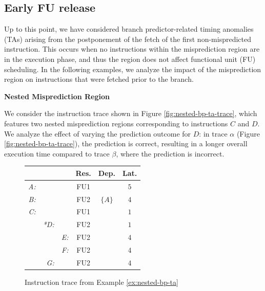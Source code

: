 \subsection{Early FU release}

Up to this point, we have considered branch predictor-related timing anomalies (TAs) arising from the postponement of the fetch of the first non-mispredicted instruction. This occurs when no instructions within the misprediction region are in the execution phase, and thus the region does not affect functional unit (FU) scheduling. In the following examples, we analyze the impact of the misprediction region on instructions that were fetched prior to the branch.

\begin{example}
\textbf{Nested Misprediction Region}

We consider the instruction trace shown in Figure \ref{fig:nested-bp-ta-trace}, which features two nested misprediction regions corresponding to instructions $C$ and $D$. We analyze the effect of varying the prediction outcome for $D$: in trace $\alpha$ (Figure \ref{fig:nested-bp-ta-trace}), the prediction is correct, resulting in a longer overall execution time compared to trace $\beta$, where the prediction is incorrect.
    
\label{ex:nested-bp-ta}
\end{example}


\begin{figure}[H]
    \centering
    \begin{tabular}{rrr|ccc}
    &  &  & Res. & Dep. & Lat. \\ \hline
    \textit{A:} &  &  & FU1 &  & $5$ \\
    \textit{B:} &  &  & FU2 & $\{A\}$ & $4$ \\
    \textit{C:} &  &  & FU1 &  & $1$ \\
    & \textit{*D:} &  & FU2 &  & $1$ \\
    &  & \textit{E:} & FU2 &  & $4$ \\
    &  & \textit{F:} & FU2 &  & $4$ \\
    & \textit{G:} &  & FU2 &  & $4$ \\
    \end{tabular}
    \caption{Instruction trace from Example \ref{ex:nested-bp-ta}}
    \label{fig:nested-bp-ta-input}
\end{figure}


